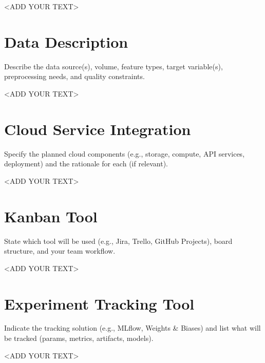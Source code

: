 \documentclass[11pt,a4paper]{article}
\begin{document}
<ADD YOUR TEXT>

\section{Data Description}
Describe the data source(s), volume, feature types, target variable(s), preprocessing needs, and quality constraints.

<ADD YOUR TEXT>

\section{Cloud Service Integration}
Specify the planned cloud components (e.g., storage, compute, API services, deployment) and the rationale for each (if relevant).

<ADD YOUR TEXT>

\section{Kanban Tool}
State which tool will be used (e.g., Jira, Trello, GitHub Projects), board structure, and your team workflow.

<ADD YOUR TEXT>

\section{Experiment Tracking Tool}
Indicate the tracking solution (e.g., MLflow, Weights \& Biases) and list what will be tracked (params, metrics, artifacts, models).

<ADD YOUR TEXT>
\end{document}
